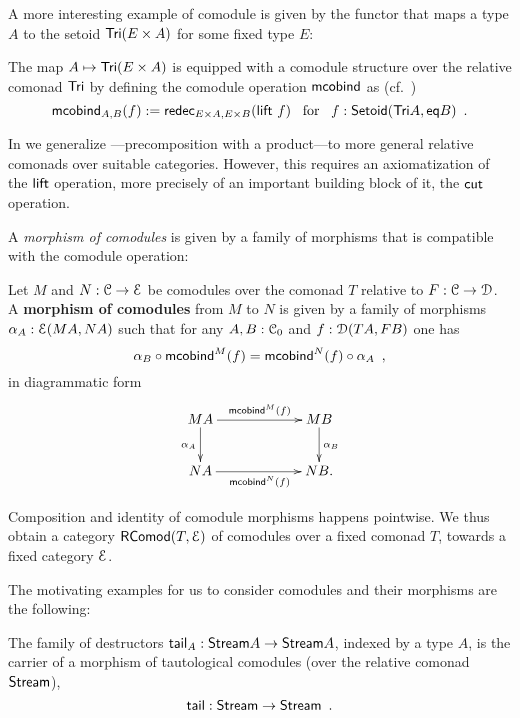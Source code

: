 \documentclass[a4paper,USenglish]{lipics}
\newcommand{\fat}[1]{\textbf{#1}}
\begin{document}
\noindent
A more interesting example of comodule is given by the functor that maps a type $A$ to the setoid $\Tri(E\times A)$
for some fixed type $E$:
\begin{ex}\label{ex_tri_prod_comod}
   The map $A \mapsto \Tri(E\times A)$ is equipped with a comodule structure over the relative comonad $\Tri$ by
   defining the comodule operation $\mcobind$ as (cf.\ )
     \[ \mcobind_{A,B} (f) := \redec_{E\times A, E\times B} (\extend~f) \enspace \text{ for } \enspace f : \Setoid(\Tri A, \eq B) \enspace . \]
\end{ex}

In  we generalize ---precomposition with a product---to more general relative comonads over suitable categories.
However, this requires an axiomatization of the $\extend$ operation, more precisely of an important building block of it, the
$\cut$ operation.

A \emph{morphism of comodules} is given by a family of morphisms that is compatible with 
the comodule operation:

\begin{defn}
\label{def:morphism_of_comodules}
 Let $M$ and $N : \C \to \E$ be comodules over the comonad $T$ relative to  $F:\C \to \D$.
 A \fat{morphism of comodules} from $M$ to $N$ is given by a family of morphisms 
   $ \alpha_A:\E(MA,NA) $
 such that for any $A,B:\C_0$ and $f : \D(TA,FB)$ one has
 \[\comp{\mcobind^M(f)}{\alpha_B} = \comp{\alpha_A}{\mcobind^N(f)} \enspace, \]
 in diagrammatic form
 \[
  \begin{xy}
   \xymatrix@C=6em{
     MA  \ar[r]^{\mcobind^M(f)}  \ar[d]_{\alpha_A} & MB \ar[d]^{\alpha_B} \\
     NA  \ar[r]_{\mcobind^N(f)}  & NB.
   }
  \end{xy}
 \]

\end{defn}

\noindent
Composition and identity of comodule morphisms happens pointwise. We thus obtain a category $\RComod(T,\E)$
 of comodules
over a fixed comonad $T$, towards a fixed category $\E$.

The motivating examples for us to consider comodules and their morphisms are the following:

 \begin{ex}\label{ex_tail_comodule}
  The family of destructors $\stail_A : \stream A \to \stream A$, indexed by a type $A$, is the carrier of a morphism of tautological comodules (over the relative comonad $\stream$),
  \[ \stail : \stream \to \stream \enspace . \]
 \end{ex}
\end{document}
